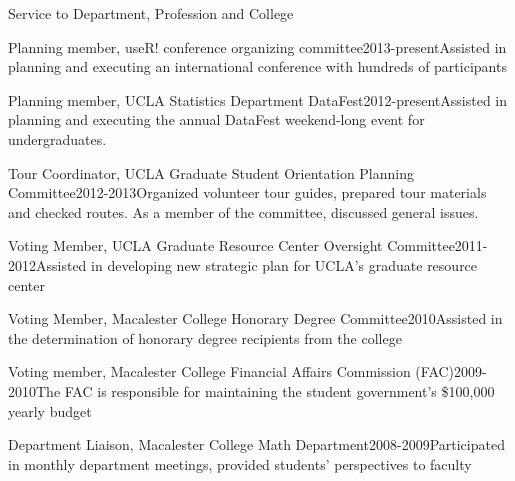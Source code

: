 \documentclass{resume} %
\begin{document}
\begin{rSection}{Service to Department, Profession and College}

\begin{sSubsection}{Planning member, useR! conference organizing committee}{}{2013-present}{Assisted in planning and executing an international conference with hundreds of participants}{}
\end{sSubsection}

\begin{sSubsection}{Planning member, UCLA Statistics Department DataFest}{}{2012-present}{Assisted in planning and executing the annual DataFest weekend-long event for undergraduates.}{}
\end{sSubsection}

\begin{sSubsection}{Tour Coordinator, UCLA Graduate Student Orientation Planning Committee}{}{2012-2013}{Organized volunteer tour guides, prepared tour materials and checked routes. As a member of the committee, discussed general issues.}{}
\end{sSubsection}

\begin{sSubsection}{Voting Member, UCLA Graduate Resource Center Oversight Committee}{}{2011-2012}{Assisted in developing new strategic plan for UCLA's graduate resource center}{}
\end{sSubsection}

\begin{sSubsection}{Voting Member, Macalester College Honorary Degree Committee}{}{2010}{Assisted in the determination of honorary degree recipients from the college}{}
\end{sSubsection}

\begin{sSubsection}{Voting member, Macalester College Financial Affairs Commission (FAC)}{}{2009-2010}{The FAC is responsible for maintaining the student government's \$100,000 yearly budget}{}
\end{sSubsection}

\begin{sSubsection}{Department Liaison, }{Macalester College Math Department}{2008-2009}{Participated in monthly department meetings, provided students' perspectives to faculty}{}
\end{sSubsection}
\end{rSection}
\end{document}
